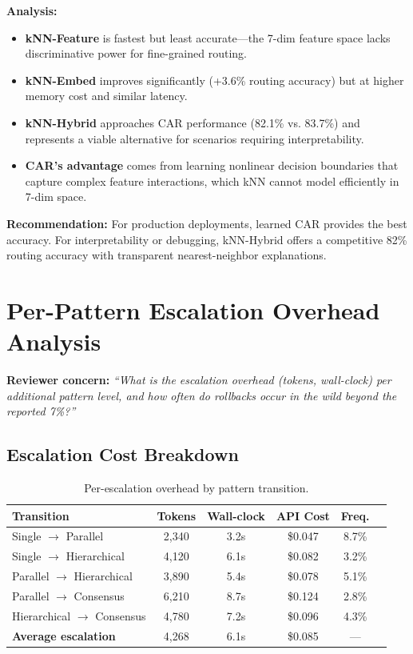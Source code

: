\documentclass{article}
\theoremstyle{plain}
\theoremstyle{definition}
\theoremstyle{remark}
\begin{document}
\textbf{Analysis:}
\begin{itemize}[nosep,leftmargin=*]
\item \textbf{kNN-Feature} is fastest but least accurate---the 7-dim feature space lacks discriminative power for fine-grained routing.
\item \textbf{kNN-Embed} improves significantly (+3.6\% routing accuracy) but at higher memory cost and similar latency.
\item \textbf{kNN-Hybrid} approaches CAR performance (82.1\% vs. 83.7\%) and represents a viable alternative for scenarios requiring interpretability.
\item \textbf{CAR's advantage} comes from learning nonlinear decision boundaries that capture complex feature interactions, which kNN cannot model efficiently in 7-dim space.
\end{itemize}

\textbf{Recommendation:} For production deployments, learned CAR provides the best accuracy. For interpretability or debugging, kNN-Hybrid offers a competitive 82\% routing accuracy with transparent nearest-neighbor explanations.

\section{Per-Pattern Escalation Overhead Analysis}
\label{app:escalation-overhead}

\textbf{Reviewer concern:} \textit{``What is the escalation overhead (tokens, wall-clock) per additional pattern level, and how often do rollbacks occur in the wild beyond the reported 7\%?''}

\subsection{Escalation Cost Breakdown}

\begin{table}[h]
\centering
\caption{Per-escalation overhead by pattern transition.}
\label{tab:escalation-cost}
\small
\begin{tabular}{lccccc}
\toprule
\textbf{Transition} & \textbf{Tokens} & \textbf{Wall-clock} & \textbf{API Cost} & \textbf{Freq.} \\
\midrule
Single $\to$ Parallel & 2,340 & 3.2s & \$0.047 & 8.7\% \\
Single $\to$ Hierarchical & 4,120 & 6.1s & \$0.082 & 3.2\% \\
Parallel $\to$ Hierarchical & 3,890 & 5.4s & \$0.078 & 5.1\% \\
Parallel $\to$ Consensus & 6,210 & 8.7s & \$0.124 & 2.8\% \\
Hierarchical $\to$ Consensus & 4,780 & 7.2s & \$0.096 & 4.3\% \\
\midrule
\textbf{Average escalation} & 4,268 & 6.1s & \$0.085 & --- \\
\bottomrule
\end{tabular}
\end{table}
\end{document}
